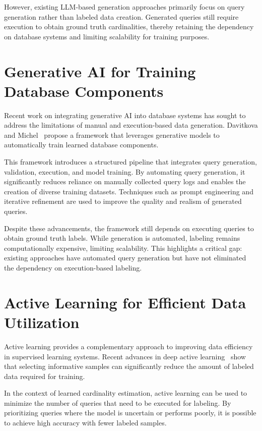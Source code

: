 However, existing LLM-based generation approaches primarily focus on query generation rather than labeled data creation. Generated queries still require execution to obtain ground truth cardinalities, thereby retaining the dependency on database systems and limiting scalability for training purposes.

\section{Generative AI for Training Database Components}

Recent work on integrating generative AI into database systems has sought to address the limitations of manual and execution-based data generation. Davitkova and Michel~\cite{DBLP:journals/corr/abs-2512-20271} propose a framework that leverages generative models to automatically train learned database components.

This framework introduces a structured pipeline that integrates query generation, validation, execution, and model training. By automating query generation, it significantly reduces reliance on manually collected query logs and enables the creation of diverse training datasets. Techniques such as prompt engineering and iterative refinement are used to improve the quality and realism of generated queries.

Despite these advancements, the framework still depends on executing queries to obtain ground truth labels. While generation is automated, labeling remains computationally expensive, limiting scalability. This highlights a critical gap: existing approaches have automated query generation but have not eliminated the dependency on execution-based labeling.

\section{Active Learning for Efficient Data Utilization}

Active learning provides a complementary approach to improving data efficiency in supervised learning systems. Recent advances in deep active learning~\cite{DBLP:journals/tnn/LiWCJDO25} show that selecting informative samples can significantly reduce the amount of labeled data required for training.

In the context of learned cardinality estimation, active learning can be used to minimize the number of queries that need to be executed for labeling. By prioritizing queries where the model is uncertain or performs poorly, it is possible to achieve high accuracy with fewer labeled samples.

